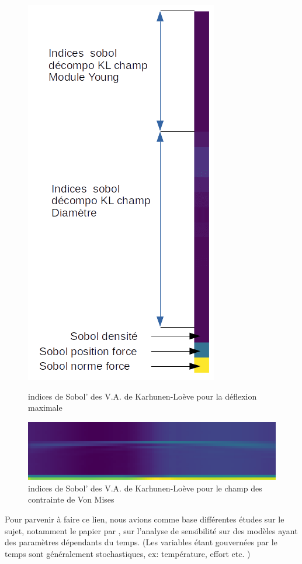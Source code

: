 \documentclass[a4paper,10pt]{article}
\begin{document}
\begin{figure}[H]
    \centering
    \begin{minipage}{0.45\textwidth}
        \centering
        \includegraphics[height=1\textwidth]{sensitivity_rv_KL_anno.png} %
        \caption{indices de Sobol’ des V.A. de Karhunen-Loève pour la déflexion maximale}
    \end{minipage}\hfill
    \begin{minipage}{0.45\textwidth}
        \centering
        \includegraphics[width=1.35\textwidth]{sensitivity_field_KL.png} %
        \caption{indices de Sobol’ des V.A. de Karhunen-Loève pour le champ des contrainte de Von Mises}
    \end{minipage}
\end{figure}

Pour parvenir à faire ce lien, nous avions comme base différentes études sur le sujet, notamment le papier par \cite{Wei2017May}, sur l'analyse de sensibilité sur des modèles ayant des paramètres dépendants du temps. (Les variables étant gouvernées par le temps sont généralement stochastiques, ex: température, effort etc. ) \\
\end{document}
